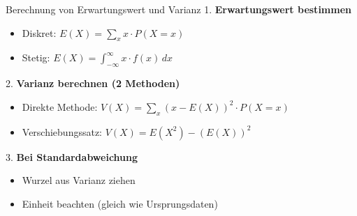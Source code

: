 \begin{KR}{Berechnung von Erwartungswert und Varianz}
1. \textbf{Erwartungswert bestimmen}
   \begin{itemize}
   \item Diskret: $E(X) = \sum_{x} x \cdot P(X=x)$
   \item Stetig: $E(X) = \int_{-\infty}^{\infty} x \cdot f(x) \, dx$
   \end{itemize}

2. \textbf{Varianz berechnen (2 Methoden)}
   \begin{itemize}
   \item Direkte Methode: $V(X) = \sum_{x} (x-E(X))^2 \cdot P(X=x)$
   \item Verschiebungssatz: $V(X) = E(X^2) - (E(X))^2$
   \end{itemize}

3. \textbf{Bei Standardabweichung}
   \begin{itemize}
   \item Wurzel aus Varianz ziehen
   \item Einheit beachten (gleich wie Ursprungsdaten)
   \end{itemize}
\end{KR}

